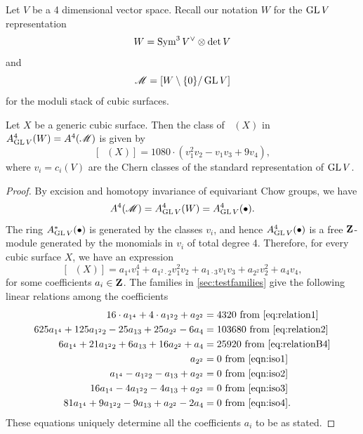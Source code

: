 \documentclass[12pt,reqno]{amsart}
\DeclareMathOperator{\Orb}{\overline{Orb}}
\numberwithin{equation}{section}
\begin{document}
Let $V$ be a 4 dimensional vector space.
Recall our notation $W$ for the $\operatorname{GL} V$ representation 
\[W = \operatorname{Sym}^3V^\vee \otimes \det V\]
and
\[\mathscr M = \left[ W \setminus \{0\} / \operatorname{GL} V \right]\]
for the moduli stack of cubic surfaces.
\begin{theorem}\label{thm:eqvclass}
  Let $X$ be a generic cubic surface.
  Then the class of $\Orb(X)$ in $A^4_{\operatorname{GL} V}(W) = A^4(\mathscr M)$ is given by
  \[
    [\Orb(X)] = 1080 \cdot \left(v_{1}^{2}v_{2} - v_{1}v_{3}+ 9v_{4}\right),
  \]
  where $v_i = c_i(V)$ are the Chern classes of the standard representation of $\operatorname{GL} V$.
\end{theorem}
\begin{proof}
  By excision and homotopy invariance of equivariant Chow groups, we have
  \[ A^4(\mathscr M) = A^4_{\operatorname{GL} V}(W) = A^4_{\operatorname{GL} V}(\bullet).\]
  The ring $A^*_{\operatorname{GL} V}(\bullet)$ is generated by the classes $v_i$, and hence $A^4_{\operatorname{GL} V}(\bullet)$ is a free ${\bf Z}$-module generated by the monomials in $v_i$ of total degree 4.
  Therefore, for every cubic surface $X$, we have an expression
  \[[\Orb(X)] = a_{1^4}v_1^4 + a_{1^2\cdot 2} v_1^2v_2 + a_{1\cdot 3} v_1v_3 + a_{2^2}v_2^2 + a_4 v_4,\]
  for some coefficients $a_i \in {\bf Z}$.
  The families in \autoref{sec:testfamilies} give the following linear relations among the coefficients
  \begin{align*}
    16 \cdot a_{1^4} + 4 \cdot a_{1^2 2} + a_{2^2} &= 4320 \text{ from \eqref{eq:relation1}}\\
    625 a_{1^{4}} + 125 a_{1^{2}2} - 25a_{13} + 25a_{2^2} - 6 a_{4} &= 103680 \text{ from \eqref{eq:relation2}}\\
    6a_{1^{4}} + 21a_{1^{2}2}+6a_{13}+16a_{2^{2}}+a_{4} &= 25920 \text{ from \eqref{eq:relationB4}}\\
    a_{2^2} &= 0  \text{ from \eqref{eqn:iso1}}\\
    a_{1^4} - a_{1^2 2}- a_{13} +  a_{2^2}  &= 0  \text{ from \eqref{eqn:iso2}}\\
    16a_{1^4} -4a_{1^2 2}- 4a_{13} +  a_{2^2}  &= 0  \text{ from \eqref{eqn:iso3}}\\
      81a_{1^4} +9a_{1^2 2}- 9a_{13} +  a_{2^2}-2a_4  &= 0  \text{ from \eqref{eqn:iso4}}.
  \end{align*}
  These equations uniquely determine all the coefficients $a_i$ to be as stated.
\end{proof}
\end{document}
